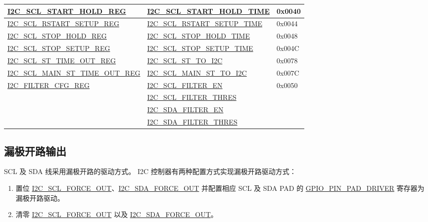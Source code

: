 \documentclass[main\_\_CN.tex]{subfiles}
\begin{document}
\begin{longtable}{ | p{6cm} | p{7cm} | p{2cm} | }
\hyperref[regdesc:I2CSCLSTARTHOLDREG]{I2C\_SCL\_START\_HOLD\_REG} & \hyperref[fielddesc:I2CSCLSTARTHOLDTIME]{I2C\_SCL\_START\_HOLD\_TIME} & 0x0040  \\ \hline
\hyperref[regdesc:I2CSCLRSTARTSETUPREG]{I2C\_SCL\_RSTART\_SETUP\_REG} & \hyperref[fielddesc:I2CSCLRSTARTSETUPTIME]{I2C\_SCL\_RSTART\_SETUP\_TIME} & 0x0044  \\ \hline

\hyperref[regdesc:I2CSCLSTOPHOLDREG]{I2C\_SCL\_STOP\_HOLD\_REG} & \hyperref[fielddesc:I2CSCLSTOPHOLDTIME]{I2C\_SCL\_STOP\_HOLD\_TIME} & 0x0048  \\ \hline
\hyperref[regdesc:I2CSCLSTOPSETUPREG]{I2C\_SCL\_STOP\_SETUP\_REG} & \hyperref[fielddesc:I2CSCLSTOPSETUPTIME]{I2C\_SCL\_STOP\_SETUP\_TIME} & 0x004C  \\ \hline

\hyperref[regdesc:I2CSCLSTTIMEOUTREG]{I2C\_SCL\_ST\_TIME\_OUT\_REG}& \hyperref[fielddesc:I2CSCLSTTOI2C]{I2C\_SCL\_ST\_TO\_I2C} & 0x0078\\ \hline
\hyperref[regdesc:I2CSCLMAINSTTIMEOUTREG]{I2C\_SCL\_MAIN\_ST\_TIME\_OUT\_REG}& \hyperref[fielddesc:I2CSCLMAINSTTOI2C]{I2C\_SCL\_MAIN\_ST\_TO\_I2C} & 0x007C\\ \hline


\multirow{4}{*}{\hyperref[regdesc:I2CFILTERCFGREG]{I2C\_FILTER\_CFG\_REG}} & {\hyperref[fielddesc:I2CSCLFILTEREN]{I2C\_SCL\_FILTER\_EN}} & \multirow{4}{*}{0x0050}  \\\cline{2-2}
& {\hyperref[fielddesc:I2CSCLFILTERTHRES]{I2C\_SCL\_FILTER\_THRES}}& \\\cline{2-2}
& {\hyperref[fielddesc:I2CSDAFILTEREN]{I2C\_SDA\_FILTER\_EN}} &  \\\cline{2-2}
& {\hyperref[fielddesc:I2CSDAFILTERTHRES]{I2C\_SDA\_FILTER\_THRES}} & \\ \hline
\end{longtable}

\subsection{漏极开路输出}
SCL 及 SDA 线采用漏极开路的驱动方式。 I2C 控制器有两种配置方式实现漏极开路驱动方式：
\begin{enumerate}
\item 置位 \hyperref[fielddesc:I2CSCLFORCEOUT]{I2C\_SCL\_FORCE\_OUT}、\hyperref[fielddesc:I2CSDAFORCEOUT]{I2C\_SDA\_FORCE\_OUT} 并配置相应 SCL 及 SDA PAD 的 \hyperref[fielddesc:GPIOPINNPADDRIVER]{GPIO\_PIN\_PAD\_DRIVER} 寄存器为漏极开路驱动。
\item 清零 \hyperref[fielddesc:I2CSCLFORCEOUT]{I2C\_SCL\_FORCE\_OUT} 以及 \hyperref[fielddesc:I2CSDAFORCEOUT]{I2C\_SDA\_FORCE\_OUT}。
\end{enumerate}
\end{document}
